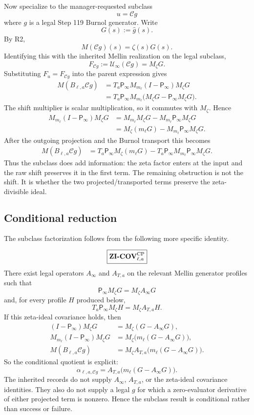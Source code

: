 \documentclass[11pt]{article}
\newcommand{\Pinfm}{\mathsf P_{\infty}}
\newcommand{\Mell}{M}
\newcommand{\Uinf}{\mathcal U_{\infty}}
\newcommand{\Chat}{\mathcal C}
\newcommand{\zetaF}{\zeta}
\begin{document}
Now specialize to the manager-requested subclass
\[
  u=\Chat g
\]
where \(g\) is a legal Step 119 Burnol generator. Write
\[
  G(s):=\widehat g(s).
\]
By R2,
\[
  \Mell(\Chat g)(s)=\zetaF(s)G(s).
\]
Identifying this with the inherited Mellin realization on the legal subclass,
\[
  F_{\Chat g}:=\Uinf(\Chat g)=M_{\zetaF}G.
\]
Substituting \(F_u=F_{\Chat g}\) into the parent expression gives
\[
\begin{aligned}
  \Mell(B_{\ell,a}\Chat g)
  &=
  T_a\Pinfm M_{m_\ell}(I-\Pinfm)M_{\zetaF}G
  \\
  &=
  T_a\Pinfm M_{m_\ell}
    \bigl(M_{\zetaF}G-\Pinfm M_{\zetaF}G\bigr).
\end{aligned}
\]
The shift multiplier is scalar multiplication, so it commutes with
\(M_{\zetaF}\). Hence
\[
\begin{aligned}
  M_{m_\ell}(I-\Pinfm)M_{\zetaF}G
  &=
  M_{m_\ell}M_{\zetaF}G
  -
  M_{m_\ell}\Pinfm M_{\zetaF}G
  \\
  &=
  M_{\zetaF}(m_\ell G)
  -
  M_{m_\ell}\Pinfm M_{\zetaF}G.
\end{aligned}
\]
After the outgoing projection and the Burnol transport this becomes
\[
\boxed{
\begin{aligned}
  \Mell(B_{\ell,a}\Chat g)
  &=
  T_a\Pinfm M_{\zetaF}(m_\ell G)
  -
  T_a\Pinfm M_{m_\ell}\Pinfm M_{\zetaF}G.
\end{aligned}}
\]
Thus the subclass does add information: the zeta factor enters at the input and
the raw shift preserves it in the first term. The remaining obstruction is not
the shift. It is whether the two projected/transported terms preserve the
zeta-divisible ideal.

\subsection*{Conditional reduction}

The subclass factorization follows from the following more specific identity.

\[
\boxed{\textbf{ZI-COV}^{\rm CP}_{\ell,a}}
\]
There exist legal operators \(A_\infty\) and \(A_{T,a}\) on the relevant
Mellin generator profiles such that
\[
  \Pinfm M_{\zetaF}G=M_{\zetaF}A_\infty G
\]
and, for every profile \(H\) produced below,
\[
  T_a\Pinfm M_{\zetaF}H=M_{\zetaF}A_{T,a}H.
\]
If this zeta-ideal covariance holds, then
\[
\begin{aligned}
  (I-\Pinfm)M_{\zetaF}G
  &=
  M_{\zetaF}(G-A_\infty G),
  \\
  M_{m_\ell}(I-\Pinfm)M_{\zetaF}G
  &=
  M_{\zetaF}\bigl(m_\ell(G-A_\infty G)\bigr),
  \\
  \Mell(B_{\ell,a}\Chat g)
  &=
  M_{\zetaF}
  A_{T,a}\bigl(m_\ell(G-A_\infty G)\bigr).
\end{aligned}
\]
So the conditional quotient is explicit:
\[
  \boxed{
  \alpha_{\ell,a,\Chat g}
  =
  A_{T,a}\bigl(m_\ell(G-A_\infty G)\bigr).
  }
\]
The inherited records do not supply \(A_\infty\), \(A_{T,a}\), or the
zeta-ideal covariance identities. They also do not supply a legal \(g\) for
which a zero-evaluator derivative of either projected term is nonzero. Hence
the subclass result is conditional rather than success or failure.
\end{document}
